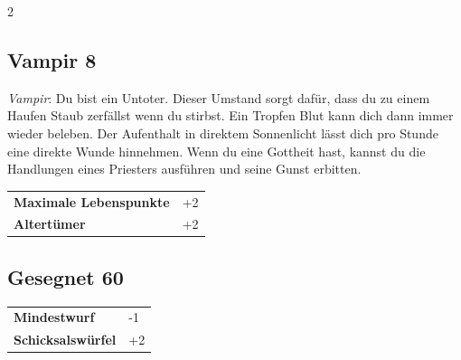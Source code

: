 \begin{multicols}{2}
\begin{tcolorbox}
\end{tcolorbox}

\begin{tcolorbox}
    \subsection*{Vampir \hfill \small{8 }}
    \tcblower
\textit{Vampir}: Du bist ein Untoter. Dieser Umstand sorgt dafür, dass du zu einem Haufen Staub zerfällst wenn du stirbst. Ein Tropfen Blut kann dich dann immer wieder beleben. Der Aufenthalt in direktem Sonnenlicht lässt dich pro Stunde eine direkte Wunde hinnehmen. Wenn du eine Gottheit hast, kannst du die Handlungen eines Priesters ausführen und seine Gunst erbitten.


\vspace{3mm}

\begin{tabular}{@{}ll@{}}
    \textbf{Maximale Lebenspunkte} & +2\\
    \textbf{Altertümer} & +2\\
\end{tabular}


\end{tcolorbox}

\begin{tcolorbox}
    \subsection*{Gesegnet \hfill \small{60 }}
    \tcblower




\begin{tabular}{@{}ll@{}}
    \textbf{Mindestwurf} & -1\\
    \textbf{Schicksalswürfel} & +2\\
\end{tabular}


\end{tcolorbox}

\end{multicols}